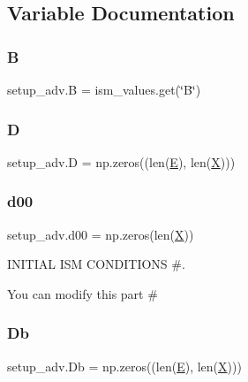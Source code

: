 \subsection{Variable Documentation}
\mbox{\label{namespacesetup__adv_ab36f8fd154648083fa30d5ed49e666ab}} 
\subsubsection{\texorpdfstring{B}{B}}
{\footnotesize\ttfamily setup\+\_\+adv.\+B = ism\+\_\+values.\+get(\char`\"{}B\char`\"{})}

\mbox{\label{namespacesetup__adv_a13d3223e855bf29aec6d028e1d1f927f}} 
\subsubsection{\texorpdfstring{D}{D}}
{\footnotesize\ttfamily setup\+\_\+adv.\+D = np.\+zeros((len(\hyperlink{namespacesetup__adv_a5934fd9692b0afe75afd78fb1f301443}{E}), len(\hyperlink{namespacesetup__adv_a6d9cd2ec966fe51739f30fabc346a12b}{X})))}

\mbox{\label{namespacesetup__adv_af7c6051ae166ca2208e04ebec0936468}} 
\subsubsection{\texorpdfstring{d00}{d00}}
{\footnotesize\ttfamily setup\+\_\+adv.\+d00 = np.\+zeros(len(\hyperlink{namespacesetup__adv_a6d9cd2ec966fe51739f30fabc346a12b}{X}))}



I\+N\+I\+T\+I\+AL I\+SM C\+O\+N\+D\+I\+T\+I\+O\+NS \#. 

You can modify this part \# \mbox{\label{namespacesetup__adv_a40a6c331b5ec220313cb6111083507d8}} 
\subsubsection{\texorpdfstring{Db}{Db}}
{\footnotesize\ttfamily setup\+\_\+adv.\+Db = np.\+zeros((len(\hyperlink{namespacesetup__adv_a5934fd9692b0afe75afd78fb1f301443}{E}), len(\hyperlink{namespacesetup__adv_a6d9cd2ec966fe51739f30fabc346a12b}{X})))}

